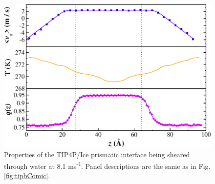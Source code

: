 \begin{figure}
\includegraphics[width=\linewidth]{Figures/Pyra_TIP4PIce_Plot}
\caption{\label{fig:tippyComic} Properties of the TIP4P/Ice prismatic
  interface being sheared through water at 8.1 ms\textsuperscript{-1}.
  Panel descriptions are the same as in Fig. \ref{fig:tipbComic}.}
\end{figure}